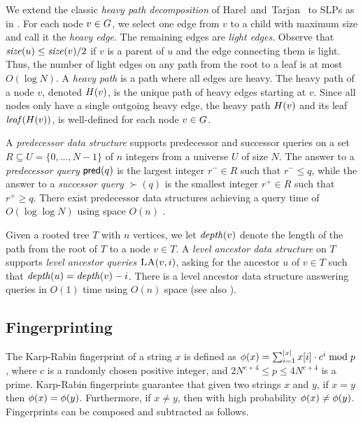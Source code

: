 We extend the classic \emph{heavy path decomposition} of Harel~and~Tarjan~\cite{harel1984fast} to SLPs as in \cite{bille2011random}. For each node $v \in G$, we select one edge from $v$ to a child with maximum size and call it the \emph{heavy edge}. The remaining edges are \emph{light edges}. Observe that $\mathit{size}(u) \leq \mathit{size}(v)/2$ if $v$ is a parent of $u$ and the edge connecting them is light. Thus, the number of light edges on any path from the root to a leaf is at most $O(\log N)$. 
A \emph{heavy path} is a path where all edges are heavy. The heavy path of a node $v$, denoted $H(v)$, is the unique path of heavy edges starting at $v$. Since all nodes only have a single outgoing heavy edge, the heavy path $H(v)$ and its leaf $\mathit{leaf}(H(v))$, is well-defined for each node $v \in G$.



A \emph{predecessor data structure} supports predecessor and successor queries on a set $R \subseteq U = \{ 0, \ldots, N-1 \}$ of $n$ integers from a universe $U$ of size $N$. The answer to a \emph{predecessor query} $\mathsf{pred}(q)$ is the largest integer $r^- \in R$ such that $r^- \leq q$, while the answer to a \emph{successor query} $\succ(q)$ is the smallest integer $r^+ \in R$ such that $r^+ \geq q$. There exist predecessor data structures achieving a query time of $O(\log \log N)$ using space $O(n)$ \cite{van1976design, mehlhorn1990bounded, willard1983log}.

Given a rooted tree $T$ with $n$ vertices, we let $\mathit{depth}(v)$ denote the length of the path from the root of $T$ to a node $v \in T$. A \emph{level ancestor data structure} on $T$ supports \emph{level ancestor queries} $\textsc{LA}(v, i)$, asking for the ancestor $u$ of $v \in T$ such that $\mathit{depth}(u) = \mathit{depth}(v)-i$. There is a level ancestor data structure answering queries in $O(1)$ time using $O(n)$ space \cite{dietz1991finding} (see also \cite{berkman1994finding, alstrup2000improved, bender2004level}).

\subsection*{Fingerprinting}
The Karp-Rabin fingerprint \cite{karp1987efficient} of a string $x$ is defined as $\phi(x) = \sum_{i=1}^{|x|} x[i] \cdot c^i \bmod p$, where $c$ is a randomly chosen positive integer, and $2N^{c+4} \leq p \leq 4N^{c+4}$ is a prime. Karp-Rabin fingerprints guarantee that given two strings $x$ and $y$, if $x = y$ then $\phi(x) = \phi(y)$. Furthermore, if $x \neq y$, then with high probability $\phi(x) \neq \phi(y)$. Fingerprints can be composed and subtracted as follows.

